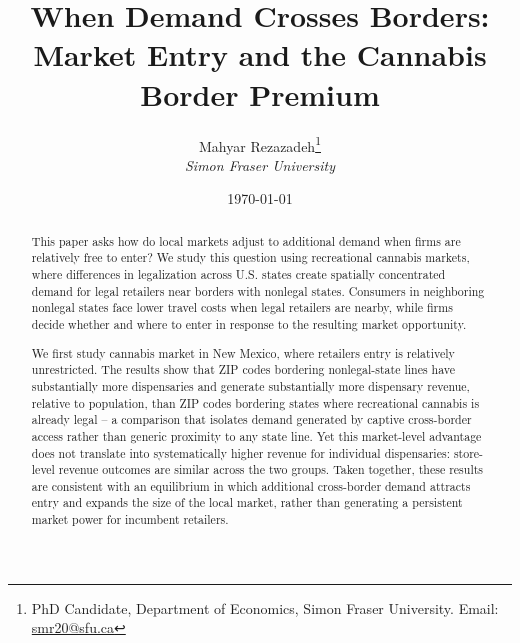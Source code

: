 \documentclass[english,12pt]{article}
\begin{document}
\sloppy
\title{When Demand Crosses Borders: Market Entry and the Cannabis Border Premium}
\author{Mahyar Rezazadeh\thanks{PhD Candidate, Department of Economics, Simon Fraser University. Email: \href{mailto:smr20@sfu.ca}{smr20@sfu.ca}}\\ {\small \emph{Simon Fraser University}}}
\date{\today}
\maketitle
\thispagestyle{empty}

\begin{abstract}
\noindent This paper asks how do local markets adjust to additional demand when firms are relatively free to enter? We study this question using recreational cannabis markets, where differences in legalization across U.S. states create spatially concentrated demand for legal retailers near borders with nonlegal states. Consumers in neighboring nonlegal states face lower travel costs when legal retailers are nearby, while firms decide whether and where to enter in response to the resulting market opportunity.

We first study cannabis market in New Mexico, where retailers entry is relatively unrestricted. The results show that ZIP codes bordering nonlegal-state lines have substantially more dispensaries and generate substantially more dispensary revenue, relative to population, than ZIP codes bordering states where recreational cannabis is already legal -- a comparison that isolates demand generated by captive cross-border access rather than generic proximity to any state line. Yet this market-level advantage does not translate into systematically higher revenue for individual dispensaries: store-level revenue outcomes are similar across the two groups. Taken together, these results are consistent with an equilibrium in which additional cross-border demand attracts entry and expands the size of the local market, rather than generating a persistent market power for incumbent retailers.


\end{abstract}
\end{document}
